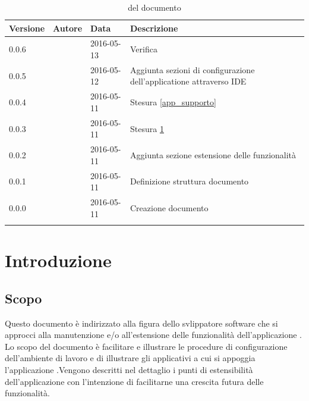 \documentclass[12pt,a4paper]{article}
\begin{document}
	\begin{center}
		\begin{longtable}[H]{p{} p{} p{} p{}}
			\toprule
			\textbf{Versione}	&	\textbf{Autore}	&	\textbf{Data}	&	\textbf{Descrizione}\\*
			\midrule
			0.0.6 & \TP{} & 2016-05-13 & Verifica \\*
			\midrule
			0.0.5 & \AVE{} & 2016-05-12 &  Aggiunta sezioni di configurazione dell'applicatione attraverso IDE   \\*
			\midrule
			
			0.0.4 & \AB{} & 2016-05-11 &  Stesura \ref{app_supporto}    \\*
			\midrule

			0.0.3 & \AB{} & 2016-05-11 &  Stesura \ref{intro}    \\*

			\midrule
			0.0.2 & \AVI{} & 2016-05-11 &  Aggiunta sezione estensione delle funzionalità \\*

			\midrule
			0.0.1 & \AB{} & 2016-05-11 &  Definizione struttura documento \\*
			\midrule
			0.0.0 & \AB{} & 2016-05-11 &  Creazione documento \\*

			\bottomrule
			\caption{\mGls{versionamento}  del documento}
			\label{tabVers1}
		\end{longtable}
	\end{center}
	
	\newpage
	\tableofcontents
	\newpage
	\listoftables
	\listoffigures
	\newpage
	
	
	\section{Introduzione}	\label{intro}
	
	\subsection{Scopo}
	Questo documento è indirizzato alla figura dello svlippatore software che si approcci alla manutenzione e/o all'estensione delle funzionalità dell'applicazione \prj{}.
	Lo scopo del documento è facilitare e illustrare le procedure di configurazione dell'ambiente di lavoro e di illustrare gli applicativi a cui si appoggia l'applicazione \prj{}.Vengono descritti nel dettaglio i punti di estensibilità dell'applicazione con l'intenzione di facilitarne una crescita futura delle funzionalità.
	
\end{document}
